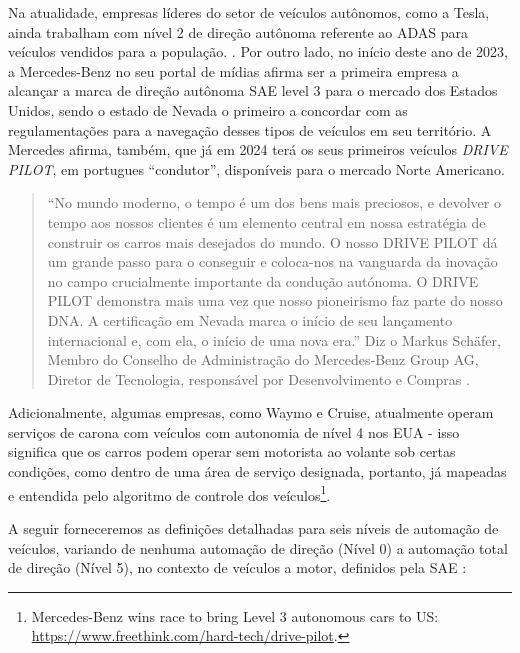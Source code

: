 Na atualidade, empresas líderes do setor de veículos autônomos, como a Tesla, ainda trabalham com nível 2 de direção autônoma referente ao ADAS para veículos vendidos para a população. \cite{4cenarios_ocidental}.
Por outro lado, no início deste ano de 2023, a Mercedes-Benz no seu portal de mídias afirma ser a primeira empresa a alcançar a marca de direção autônoma SAE level 3 para o mercado dos Estados Unidos, sendo o estado de Nevada o primeiro a concordar com as regulamentações para a navegação desses tipos de veículos em seu território. A Mercedes afirma, também, que já em 2024 terá os seus primeiros veículos \textit{DRIVE PILOT}, em portugues “condutor”, disponíveis para o mercado Norte Americano\cite{mercedes3}.

\begin{quote}
“No mundo moderno, o tempo é um dos bens mais preciosos, e devolver o tempo aos nossos clientes é um elemento central em nossa estratégia de construir os carros mais desejados do mundo. O nosso DRIVE PILOT dá um grande passo para o conseguir e coloca-nos na vanguarda da inovação no campo crucialmente importante da condução autónoma. O DRIVE PILOT demonstra mais uma vez que nosso pioneirismo faz parte do nosso DNA. A certificação em Nevada marca o início de seu lançamento internacional e, com ela, o início de uma nova era.”
Diz o Markus Schäfer, Membro do Conselho de Administração do Mercedes‑Benz Group AG, Diretor de Tecnologia, responsável por Desenvolvimento e Compras \cite{mercedes3}.
\end{quote}

Adicionalmente, algumas empresas, como Waymo e Cruise, atualmente operam serviços de carona com veículos com autonomia de nível 4 nos EUA - isso significa que os carros podem operar sem motorista ao volante sob certas condições, como dentro de uma área de serviço designada, portanto, já mapeadas e entendida pelo algoritmo de controle dos veículos\footnote{Mercedes-Benz wins race to bring Level 3 autonomous cars to US: \url{https://www.freethink.com/hard-tech/drive-pilot}.}.



A seguir forneceremos as definições detalhadas para seis níveis de automação de veículos, variando de nenhuma automação de direção (Nível 0) a automação total de direção (Nível 5), no contexto de veículos a motor, definidos pela SAE \cite{SAE}:

